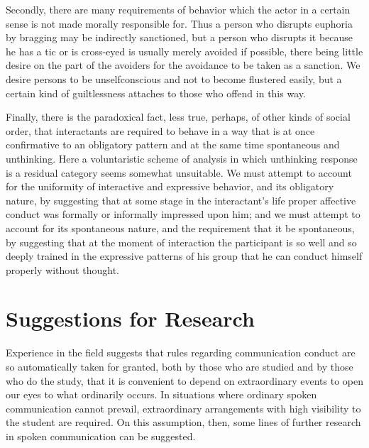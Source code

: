 \documentclass[openany,nobib]{tufte-book}
\begin{document}
Secondly, there are many requirements of behavior which the actor in a
certain sense is not made morally responsible for. Thus a person who
disrupts euphoria by bragging may be indirectly sanctioned, but a person
who disrupts it because he has a tic or is cross-eyed is usually merely
avoided if possible, there being little desire on the part of the
avoiders for the avoidance to be taken as a sanction. We desire persons
to be unselfconscious and not to become flustered easily, but a certain
kind of guiltlessness attaches to those who offend in this way.

Finally, there is the paradoxical fact, less true, perhaps, of other
kinds of social order, that interactants are required to behave in a way
that is at once confirmative to an obligatory pattern and at the same
time spontaneous and unthinking. Here a voluntaristic scheme of analysis
in which unthinking response is a residual category seems somewhat
unsuitable. We must attempt to account for the uniformity of interactive
and expressive behavior, and its obligatory nature, by suggesting that
at some stage in the interactant's life proper affective conduct was
formally or informally impressed upon him; and we must attempt to
account for its spontaneous nature, and the requirement that it be
spontaneous, by suggesting that at the moment of interaction the
participant is so well and so deeply trained in the expressive patterns
of his group that he can conduct himself properly without thought.

\hypertarget{suggestions-for-research}{%
\section{Suggestions for Research}\label{suggestions-for-research}}

Experience in the field suggests that rules regarding communication
conduct are so automatically taken for granted, both by those who are
studied and by those who do the study, that it is convenient to depend
on extraordinary events to open our eyes to what ordinarily occurs. In
situations where ordinary spoken communication cannot prevail,
extraordinary arrangements with high visibility to the student are
required. On this assumption, then, some lines of further research in
spoken communication can be suggested.
\end{document}
